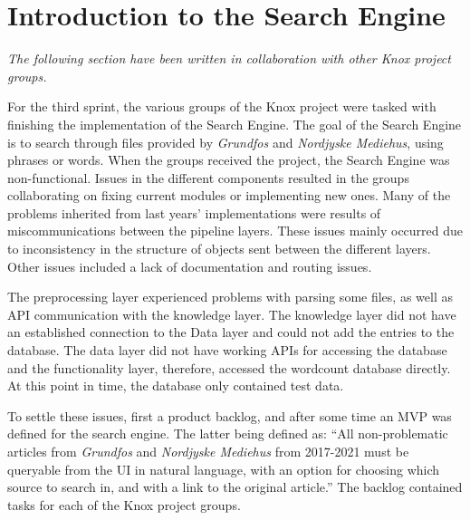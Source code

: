 \section{Introduction to the Search Engine}\label{SHARED-search-engine}
\textit{The following section have been written in collaboration with other Knox project groups.}

For the third sprint, the various groups of the Knox project were tasked with finishing the implementation of the Search Engine. The goal of the Search Engine is to search through files provided by \textit{Grundfos} and \textit{Nordjyske Mediehus}, using phrases or words. When the groups received the project, the Search Engine was non-functional. Issues in the different components resulted in the groups collaborating on fixing current modules or implementing new ones. Many of the problems inherited from last years' implementations were results of miscommunications between the pipeline layers. These issues mainly occurred due to inconsistency in the structure of objects sent between the different layers. Other issues included a lack of documentation and routing issues. 

The preprocessing layer experienced problems with parsing some files, as well as API communication with the knowledge layer. The knowledge layer did not have an established connection to the Data layer and could not  add the entries to the database. The data layer did not have working APIs for accessing the database and the functionality layer, therefore, accessed the wordcount database directly. At this point in time, the database only contained test data.

To settle these issues, first a product backlog, and after some time an MVP was defined for the search engine. The latter being defined as: “All non-problematic articles from \textit{Grundfos} and \textit{Nordjyske Mediehus} from 2017-2021 must be queryable from the UI in natural language, with an option for choosing which source to search in, and with a link to the original article.” 
The backlog contained tasks for each of the Knox project groups.